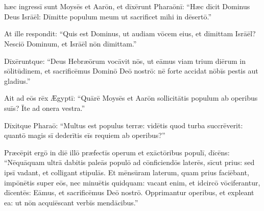 \chapter{}
\thispagestyle{empty}

 hæc ingressī sunt Moysēs
et Aarōn, et dīxērunt Pharaōnī: ``Hæc dīcit Dominus Deus
Isrāēl: Dīmitte populum meum ut
sacrificet mihi in dēsertō.''

At ille respondit: ``Quis est
Dominus, ut audiam vōcem eius, et dīmittam Isrāēl? Nesciō
Dominum, et Isrāēl nōn dīmittam.''

Dīxēruntque: ``Deus
Hebræōrum vocāvit nōs, ut eāmus viam trium diērum in
sōlitūdinem, et
sacrificēmus Dominō Deō nostrō: nē forte accidat nōbīs
pestis aut
gladius.''

Ait ad eōs rēx Ægyptī: ``Quārē
Moysēs et Aarōn sollicitātis populum ab
operibus suīs? Īte ad onera vestra.''

Dīxitque
Pharaō: ``Multus est populus terræ: vidētis quod turba
succrēverit: quantō magis sī dederītis eīs
requiem ab operibus?'' 


Præcēpit ergō in diē illō
præfectīs operum et exāctōribus populī,
dīcēns:  ``Nēquā\-quam ultrā dabitis paleās
populō ad cōnficiendōs laterēs, sīcut prius: sed ipsī vadant, 
et colligant stipulās. 
Et mēnsūram laterum, quam prius faciēbant, impōnētis super eōs, nec
minuētis quidquam: vacant enim, et
idcircō vōciferantur, dīcentēs: Eāmus, et sacrificēmus
Deō nostrō.  Opprimantur operibus, et expleant ea: ut nōn
acquiēscant verbīs
mendācibus.''

